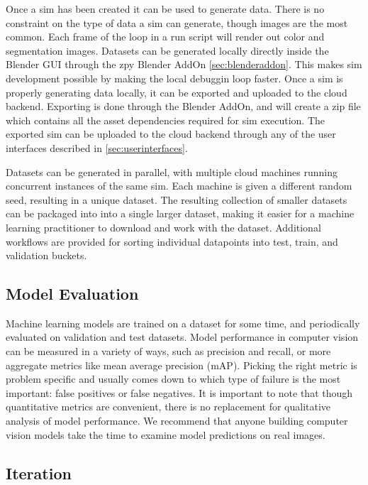 \documentclass{article}
\begin{document}
Once a sim has been created it can be used to generate data. There is no constraint on the type of data a sim can generate, though images are the most common. Each frame of the loop in a run script will render out color and segmentation images. Datasets can be generated locally directly inside the Blender GUI through the zpy Blender AddOn \ref{sec:blenderaddon}. This makes sim development possible by making the local debuggin loop faster. Once a sim is properly generating data locally, it can be exported and uploaded to the cloud backend. Exporting is done through the Blender AddOn, and will create a zip file which contains all the asset dependencies required for sim execution. The exported sim can be uploaded to the cloud backend through any of the user interfaces described in \ref{sec:userinterfaces}.

Datasets can be generated in parallel, with multiple cloud machines running concurrent instances of the same sim. Each machine is given a different random seed, resulting in a unique dataset. The resulting collection of smaller datasets can be packaged into into a single larger dataset, making it easier for a machine learning practitioner to download and work with the dataset. Additional workflows are provided for sorting individual datapoints into test, train, and validation buckets.

\subsection{Model Evaluation}
\label{sec:evaluation}

Machine learning models are trained on a dataset for some time, and periodically evaluated on validation and test datasets. Model performance in computer vision can be measured in a variety of ways, such as precision and recall, or more aggregate metrics like mean average precision (mAP). Picking the right metric is problem specific and usually comes down to which type of failure is the most important: false positives or false negatives. It is important to note that though quantitative metrics are convenient, there is no replacement for qualitative analysis of model performance. We recommend that anyone building computer vision models take the time to examine model predictions on real images.

\subsection{Iteration}
\label{sec:iteration}
\end{document}
